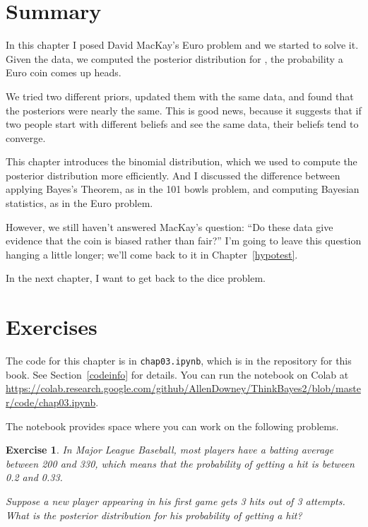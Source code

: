 \documentclass[12pt]{book}
\theoremstyle{exercise}
\newtheorem{exercise}{Exercise}[chapter]
\begin{document}

\section{Summary}

In this chapter I posed David MacKay's Euro problem and we started to solve it.
Given the data, we computed the posterior distribution for , the probability a Euro coin comes up heads.

We tried two different priors, updated them with the same data, and found that the posteriors were nearly the same.
This is good news, because it suggests that if two people start with different beliefs and see the same data, their beliefs tend to converge.

This chapter introduces the binomial distribution, which we used to compute the posterior distribution more efficiently.
And I discussed the difference between applying Bayes's Theorem, as in the 101 bowls problem, and computing Bayesian statistics, as in the Euro problem.


However, we still haven't answered MacKay's question: ``Do these data give evidence that the coin is biased rather than fair?''
I'm going to leave this question hanging a little longer; we'll come back to it in Chapter~\ref{hypotest}.

In the next chapter, I want to get back to the dice problem.

\section{Exercises}

The code for this chapter is in {\tt chap03.ipynb}, which is in the repository for this book.  See Section~\ref{codeinfo} for details.
You can run the notebook on Colab at \url{https://colab.research.google.com/github/AllenDowney/ThinkBayes2/blob/master/code/chap03.ipynb}.

The notebook provides space where you can work on the following problems.


\begin{exercise}
In Major League Baseball, most players have a batting average between 200 and 330, which means that the probability of getting a hit is between 0.2 and 0.33.

Suppose a new player appearing in his first game gets 3 hits out of 3 attempts.  What is the posterior distribution for his probability of getting a hit?
\end{exercise}
\end{document}
